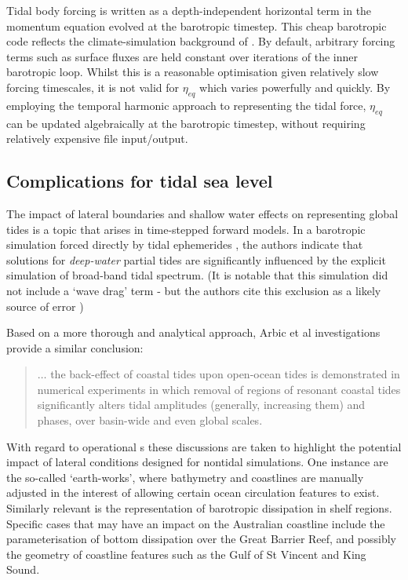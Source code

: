 Tidal body forcing is written as a depth-independent horizontal term in the momentum equation evolved at the barotropic timestep.
This cheap barotropic code reflects the climate-simulation background of \MOM{}.  
By default, arbitrary forcing terms such as surface fluxes are held constant over iterations of the inner barotropic loop.  
Whilst this is a reasonable optimisation given relatively slow forcing timescales, it is not valid for $\eta_{eq}$ which varies powerfully and quickly.
By employing the temporal harmonic approach to representing the tidal force, $\eta_{eq}$ can be updated algebraically at the barotropic timestep, without requiring relatively expensive file input/output.


\subsection{Complications for tidal sea level}
The impact of lateral boundaries and shallow water effects on representing global tides is a topic that arises in time-stepped forward models.
In a barotropic simulation forced directly by tidal ephemerides \cite{Weis:2008ex}, the authors indicate that solutions for \emph{deep-water} partial tides are significantly influenced by the explicit simulation of broad-band tidal spectrum.   
(It is notable that this simulation did not include a `wave drag' term - but the authors cite this exclusion as a likely source of error \citep[pp5]{Weis:2008ex})

Based on a more thorough and analytical approach, Arbic et al investigations provide a similar conclusion:
\noindent \begin{quotation}
$\dots{}$ the back-effect of coastal tides upon open-ocean tides is demonstrated in numerical experiments in which removal of regions of resonant coastal tides significantly alters tidal amplitudes (generally, increasing them) and phases, over basin-wide and even global scales.\citep[pp263]{Arbic:2009in}
\end{quotation}

With regard to operational \OGCM{}s these discussions are taken to highlight the potential impact of lateral conditions designed for nontidal simulations.  
One instance are the so-called `earth-works', where bathymetry and coastlines are manually adjusted in the interest of allowing certain ocean circulation features to exist.  
Similarly relevant is the representation of barotropic dissipation in shelf regions. 
Specific cases that may have an impact on the Australian coastline include the parameterisation of bottom dissipation over the Great Barrier Reef, and possibly the geometry of coastline features such as the Gulf of St Vincent and King Sound.



